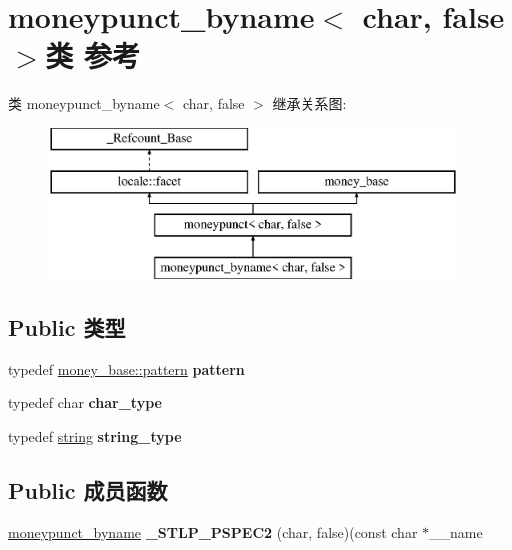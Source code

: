 \hypertarget{classmoneypunct__byname_3_01char_00_01false_01_4}{}\section{moneypunct\+\_\+byname$<$ char, false $>$类 参考}
\label{classmoneypunct__byname_3_01char_00_01false_01_4}
类 moneypunct\+\_\+byname$<$ char, false $>$ 继承关系图\+:\begin{figure}[H]
\begin{center}
\leavevmode
\includegraphics[height=4.000000cm]{classmoneypunct__byname_3_01char_00_01false_01_4}
\end{center}
\end{figure}
\subsection*{Public 类型}
\begin{DoxyCompactItemize}
\item 
\mbox{\label{classmoneypunct__byname_3_01char_00_01false_01_4_aadaefa5584ec51808a8fa1e33eefe953}} 
typedef \hyperlink{structmoney__base_1_1pattern}{money\+\_\+base\+::pattern} {\bfseries pattern}
\item 
\mbox{\label{classmoneypunct__byname_3_01char_00_01false_01_4_a24fd0873aeb3e2e937720a8b739690fd}} 
typedef char {\bfseries char\+\_\+type}
\item 
\mbox{\label{classmoneypunct__byname_3_01char_00_01false_01_4_ae78679aaa11597e16b0bb7119028982e}} 
typedef \hyperlink{structstring}{string} {\bfseries string\+\_\+type}
\end{DoxyCompactItemize}
\subsection*{Public 成员函数}
\begin{DoxyCompactItemize}
\item 
\mbox{\label{classmoneypunct__byname_3_01char_00_01false_01_4_aab079a388decb4daddcc139805bfdefe}} 
\hyperlink{classmoneypunct__byname}{moneypunct\+\_\+byname} {\bfseries \+\_\+\+S\+T\+L\+P\+\_\+\+P\+S\+P\+E\+C2} (char, false)(const char $\ast$\+\_\+\+\_\+name
\end{DoxyCompactItemize}
